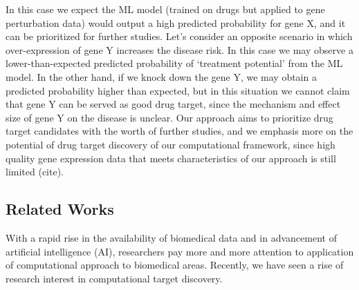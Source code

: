     In this case we expect the ML model (trained on drugs but applied to gene perturbation data) would output a high predicted probability for gene X, and it can be prioritized for further studies. Let’s consider an opposite scenario in which over-expression of gene Y increases the disease risk. In this case we may observe a lower-than-expected predicted probability of ‘treatment potential’ from the ML model. In the other hand, if we knock down the gene Y, we may obtain a predicted probability higher than expected, but in this situation we cannot claim that gene Y can be served as good drug target, since the mechanism and effect size of gene Y on the disease is unclear. Our approach aims to prioritize drug target candidates with the worth of further studies, and we emphasis more on the potential of drug target discovery of our computational framework, since high quality gene expression data that meets characteristics of our approach is still limited (cite).

  \subsection{Related Works}
    With a rapid rise in the availability of biomedical data and in advancement of artificial intelligence (AI), researchers pay more and more attention to application of computational approach to biomedical areas. Recently, we have seen a rise of research interest in computational target discovery. 
    

